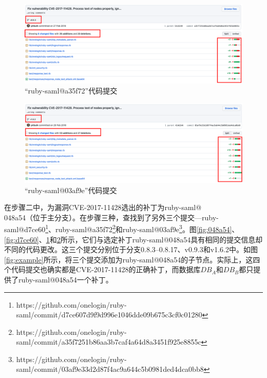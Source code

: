 \begin{figure}[!t]
    \centering
    \includegraphics[scale=0.30]{fig/11428-commit-a35f72}
    \caption{“ruby-saml@a35f72”代码提交}\label{fig:a35f72}
\end{figure}

\begin{figure}[!t]
    \centering
    \includegraphics[scale=0.30]{fig/11428-commit-03af9e}
    \caption{“ruby-saml@03af9e”代码提交}\label{fig:03af9e}
\end{figure}

\begin{exmp}
在步骤二中，\tool 为漏洞CVE-2017-11428选出的补丁为ruby-saml@\\048a54（位于主分支）。在步骤三种，\tool 查找到了另外三个提交---ruby-saml@d7ce60\footnote{https://github.com/onelogin/ruby-saml/commit/d7ce607d9f9d996e1046dde09b675c3cf0c01280}、ruby-saml@a35f72\footnote{https://github.com/onelogin/ruby-saml/commit/a35f7251b86aa3b7caf4a64d8a3451f925e8855c}和ruby-saml@03af9e\footnote{https://github.com/onelogin/ruby-saml/commit/03af9e33d2d87f4ac9a644c5b0981ded4dca0bb8}。图\ref{fig:048a54}、\ref{fig:d7ce60}、\ref{fig:a35f72}和\ref{fig:03af9e}所示，它们与选定补丁ruby-saml@048a54具有相同的提交信息却不同的代码更改。这三个提交分别位于分支0.8.3--0.8.17、v0.9.3和v1.6.2中。如图\ref{fig:example}所示，\tool 将三个提交添加为ruby-saml@048a54的子节点。实际上，这四个代码提交也确实都是CVE-2017-11428的正确补丁，而数据库$DB_A$和$DB_B$都只提供了ruby-saml@048a54一个补丁。
\end{exmp}